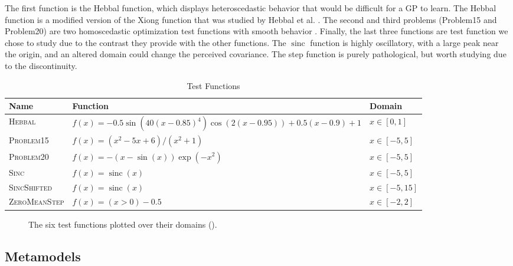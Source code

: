 \documentclass[conference]{IEEEtran}
\DeclareMathOperator{\sinc}{sinc}
\begin{document}
	The first function is the Hebbal function, which displays heteroscedastic behavior that would be difficult for a GP to learn. The Hebbal function is a modified version of the Xiong function that was studied by Hebbal et al. \cite{hebbal2019bayesian}. The second and third problems (Problem15 and Problem20) are two homoscedastic optimization test functions with smooth behavior \cite{1-DFunctions}. Finally, the last three functions are test function we chose to study due to the contrast they provide with the other functions. The $\sinc$ function is highly oscillatory, with a large peak near the origin, and an altered domain could change the perceived covariance. The step function is purely pathological, but worth studying due to the discontinuity. 
	
	\begin{table*}[htbp]
    \renewcommand{\arraystretch}{1.3}
    \centering
    \caption{Test Functions}
    \label{tab:test_fns}
        \begin{tabular}{lll}
        \toprule 
        \bfseries Name & \bfseries Function & \bfseries Domain \\ \midrule
	    \textsc{Hebbal} & $f(x) = -0.5 \sin\left(40 (x-0.85)^4\right) \cos(2(x-0.95)) + 0.5(x-0.9) + 1$ & $x \in [0, 1]$ \\
	    \textsc{Problem15} & $f(x) = (x^2 - 5x + 6) / (x^2 + 1) $ & $x \in [-5, 5]$ \\
	    \textsc{Problem20} & $f(x) = -(x - \sin(x))\exp(-x^2) $ & $x \in [-5, 5]$ \\
	    \textsc{Sinc} & $f(x) = \sinc(x) $ & $x \in [-5, 5]$ \\
	    \textsc{SincShifted} & $f(x) = \sinc(x) $ & $x \in [-5, 15]$ \\
	    \textsc{ZeroMeanStep} & $f(x) = (x > 0) - 0.5 $ & $x \in [-2, 2]$ \\
	    \bottomrule
	    \end{tabular}
	\end{table*}
	
	\begin{figure*}[htbp]
	    \centering
	    
	    \caption{The six test functions plotted over their domains ().}
	    \label{fig:test_fns}
	\end{figure*}
	
	\subsection{Metamodels}
	
\end{document}
